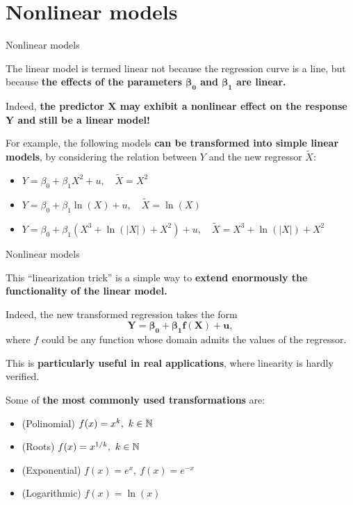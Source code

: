 \documentclass[aspectratio=169]{beamer}
\begin{document}
\section{\Large Nonlinear models}

\begin{frame}{Nonlinear models}

The linear model is termed linear not because the regression curve is a line, but because \textbf{the effects of the parameters $\pmb{\beta_0}$ and $\pmb{\beta_1}$ are linear.} 
\vspace{0.4cm}

Indeed, \textbf{the predictor $\pmb{X}$ may exhibit a nonlinear effect on the response $\pmb{Y}$ and still be a linear model!} 
\vspace{0.4cm}

For example, the following models \textbf{can be transformed into simple linear models}, by considering the relation between $Y$ and the new regressor $\widetilde{X}$:
\vspace{0.2cm}

\begin{itemize}
    \item $Y = \beta_0 + \beta_1X^2 + u,\quad \widetilde{X} = X^2$
    \item $Y = \beta_0 + \beta_1\ln(X) + u,\quad \widetilde{X} = \ln(X)$
    \item $Y = \beta_0 + \beta_1(X^3 + \ln(|X|) + X^2) + u,\quad \widetilde{X} = X^3 + \ln(|X|) + X^2$
\end{itemize}

\end{frame}


\begin{frame}{Nonlinear models}

This ``linearization trick'' is a simple way to \textbf{extend enormously the functionality of the linear model.} 
\vspace{0.4cm}

Indeed, the new transformed regression takes the form
$$
\pmb{Y = \beta_0 + \beta_1 f(X) + u,}
$$
where $f$ could be any function whose domain admits the values of the regressor.
\vspace{0.4cm}

This is \textbf{particularly useful in real applications}, where linearity is hardly verified.  
\vspace{0.4cm}

Some of \textbf{the most commonly used transformations} are:
\vspace{0.1cm}

\begin{itemize}
    \item (Polinomial) $f(x) = x^k,\ k\in \mathbb{N}$
    \item (Roots) $f(x) = x^{1/k},\ k\in \mathbb{N}$
    \item (Exponential) $f(x) = e^x,\ f(x) = e^{-x}$
    \item (Logarithmic) $f(x) = \ln(x)$
\end{itemize}

\end{frame}
\end{document}

